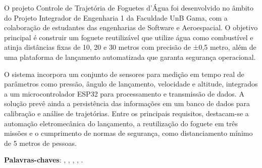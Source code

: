 \begin{resumo}


O projeto Controle de Trajetória de Foguetes d’Água foi desenvolvido no âmbito do Projeto Integrador de Engenharia 1 da Faculdade UnB Gama, com a colaboração de estudantes das engenharias de Software e Aeroespacial. O objetivo principal é construir um foguete reutilizável que utilize água como combustível e atinja distâncias fixas de 10, 20 e 30 metros com precisão de ±0,5 metro, além de uma plataforma de lançamento automatizada que garanta segurança operacional.

O sistema incorpora um conjunto de sensores para medição em tempo real de parâmetros como pressão, ângulo de lançamento, velocidade e altitude, integrados a um microcontrolador ESP32 para processamento e transmissão de dados. A solução prevê ainda a persistência das informações em um banco de dados para calibração e análise de trajetórias. Entre os principais requisitos, destacam-se a automação eletromecânica do lançamento, a reutilização do foguete em três missões e o cumprimento de normas de segurança, como distanciamento mínimo de 5 metros de pessoas.

\vspace{\onelineskip}
\noindent
\textbf{Palavras-chaves}:{ \imprimirpalavrachaveum, \imprimirpalavrachavedois, \imprimirpalavrachavetres, \imprimirpalavrachavequatro, \imprimirpalavrachavecinco.}
\end{resumo}


    
